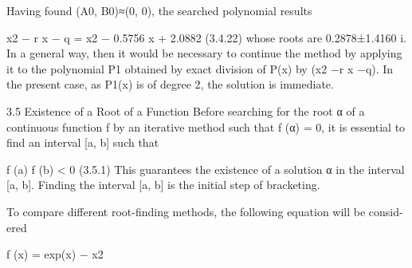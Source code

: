 \documentclass[letterpaper,12pt]{article}
\begin{document}
Having found (A0, B0)≈(0, 0), the searched polynomial results

x2 − r x − q = x2 − 0.5756 x + 2.0882 (3.4.22)
whose roots are 0.2878±1.4160 i. In a general way, then it would be necessary to continue the method
by applying it to the polynomial P1 obtained by exact division of P(x) by (x2 −r x −q). In the present
case, as P1(x) is of degree 2, the solution is immediate.

3.5 Existence of a Root of a Function
Before searching for the root α of a continuous function f by an iterative method such
that f (α) = 0, it is essential to find an interval [a, b] such that

f (a) f (b) < 0 (3.5.1)
This guarantees the existence of a solution α in the interval [a, b]. Finding the interval
[a, b] is the initial step of bracketing.

To compare different root-finding methods, the following equation will be consid-
ered

f (x) = exp(x) − x2
\end{document}

